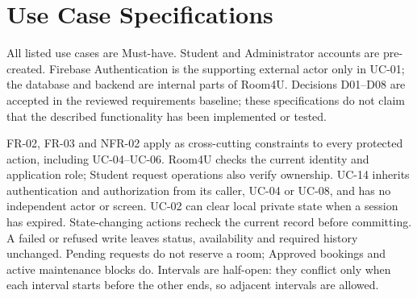 \section{Use Case Specifications}

All listed use cases are Must-have. Student and Administrator accounts are pre-created. Firebase Authentication is the supporting external actor only in UC-01; the database and backend are internal parts of Room4U. Decisions D01--D08 are accepted in the reviewed requirements baseline; these specifications do not claim that the described functionality has been implemented or tested.

FR-02, FR-03 and NFR-02 apply as cross-cutting constraints to every protected action, including UC-04--UC-06. Room4U checks the current identity and application role; Student request operations also verify ownership. UC-14 inherits authentication and authorization from its caller, UC-04 or UC-08, and has no independent actor or screen. UC-02 can clear local private state when a session has expired. State-changing actions recheck the current record before committing. A failed or refused write leaves status, availability and required history unchanged. Pending requests do not reserve a room; Approved bookings and active maintenance blocks do. Intervals are half-open: they conflict only when each interval starts before the other ends, so adjacent intervals are allowed.

